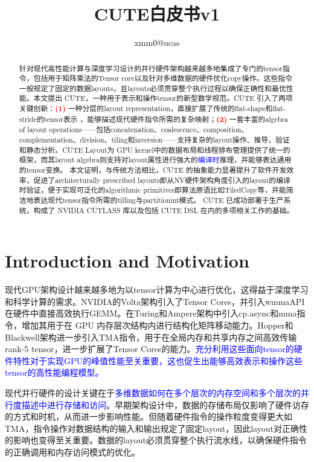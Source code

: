 \documentclass{article}
\title{CUTE白皮书v1}
\author{xmm0@ucas}
\begin{document}
\maketitle

\begin{abstract}
针对现代高性能计算与深度学习设计的并行硬件架构越来越多地集成了专门的tensor指令，包括用于矩阵乘法的Tensor core以及针对多维数据的硬件优化copy操作。这些指令一般规定了固定的数据layouts，且layouts必须贯穿整个执行过程以确保正确性和最优性能。本文提出 CUTE，一种用于表示和操作tensor的新型数学规范。CUTE 引入了两项关键创新：\textcolor{red}{\textbf{(1)}} 一种分层的layout representation，直接扩展了传统的flat-shape和flat-stride的tensor表示 ，能够描述现代硬件指令所需的复杂映射；\textcolor{red}{\textbf{(2)}} 一套丰富的algebra of layout operations——包括concatenation、coalescence、composition、complementation、division、tiling和inversion——支持复杂的layout操作、推导、验证和静态分析。CUTE Layout为 GPU  kernel中的数据布局和线程排布管理提供了统一的框架，而其layout algebra则支持对layout属性进行强大的\textcolor{blue}{编译时}推理，并能够表达通用的tensor变换。
本文证明，与传统方法相比，CUTE 的抽象能力显著提升了软件开发效率，促进了architecturally prescribed layouts即从NV硬件架构角度引入的layout的编译时验证，便于实现可泛化的algorithmic primitives即算法原语比如TiledCopy等，并能简洁地表达现代tensor指令所需的tilling与partitionint模式。
CUTE 已成功部署于生产系统，构成了 NVIDIA CUTLASS 库以及包括 CUTE DSL 在内的多项相关工作的基础。
\end{abstract}

\section{Introduction and Motivation}
现代GPU架构设计越来越多地为以tensor计算为中心进行优化，这得益于深度学习和科学计算的需求。NVIDIA的Volta架构引入了Tensor Cores，并引入wmmaAPI在硬件中直接高效执行GEMM。在Turing和Ampere架构中引入cp.async和mma指令，增加其用于在 GPU 内存层次结构内进行结构化矩阵移动能力。Hopper和Blackwell架构进一步引入TMA指令，用于在全局内存和共享内存之间高效传输rank-5 tensor，进一步扩展了Tensor Cores的能力。\textcolor{blue}{充分利用这些面向tensor的硬件特性对于实现GPU的峰值性能至关重要，这也促生出能够高效表示和操作这些tensor的高性能编程模型。}  

现代并行硬件的设计关键在于\textcolor{blue}{多维数据如何在多个层次的内存空间和多个层次的并行度描述中进行存储和访问}。早期架构设计中，数据的存储布局仅影响了硬件访存的方式和时机，从而进一步影响性能。但随着硬件指令的操作粒度变得更大如TMA，指令操作对数据结构的输入和输出规定了固定layout，因此layout对正确性的影响也变得至关重要。数据的layout必须贯穿整个执行流水线，以确保硬件指令的正确调用和内存访问模式的优化。
\end{document}
